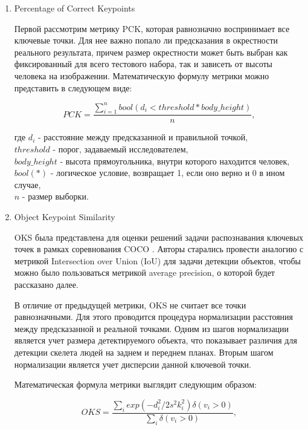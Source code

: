 \begin{enumerate}
\item Percentage of Correct Keypoints

Первой рассмотрим метрику PCK, которая равнозначно воспринимает все ключевые точки. Для нее важно попало ли предсказания в окрестности реального результата, причем размер окрестности может быть выбран как фиксированный для всего тестового набора, так и зависеть от высоты человека на изображении. Математическую формулу метрики можно представить в следующем виде:

\begin{equation}
	PCK = \frac{\sum_{i=1}^{n} bool(d_i < threshold * body\_height)}{n},
\end{equation}
	
где $d_i$ - расстояние между предсказанной и правильной точкой,\\
$threshold$ - порог, задаваемый исследователем,\\
$body\_height$ - высота прямоугольника, внутри которого находится человек,\\
$bool(*)$ - логическое условие, возвращает 1, если оно верно и 0 в ином случае,\\
$n$ - размер выборки.

\item Object Keypoint Similarity

OKS была представлена для оценки решений задачи распознавания ключевых точек в рамках соревнования COCO \cite{COCO_topology}. Авторы старались провести аналогию с метрикой Intersection over Union (IoU) для задачи детекции объектов, чтобы можно было пользоваться метрикой average precision, о которой будет рассказано далее.

В отличие от предыдущей метрики, OKS не считает все точки равнозначными. Для этого проводится процедура нормализации расстояния между предсказанной и реальной точками. Одним из шагов нормализации является учет размера детектируемого объекта, что показывает различия для детекции скелета людей на заднем и переднем планах. Вторым шагом нормализации является учет дисперсии данной ключевой точки.

\hfill

Математическая формула метрики выглядит следующим образом:

\begin{equation}
	OKS = \frac{\sum_{i} exp\left( - d_i^2 / 2s^2k_i^2\right)\delta\left(v_i > 0\right)}{\sum_{i} \delta\left(v_i > 0\right)},
\end{equation}


\end{enumerate}
